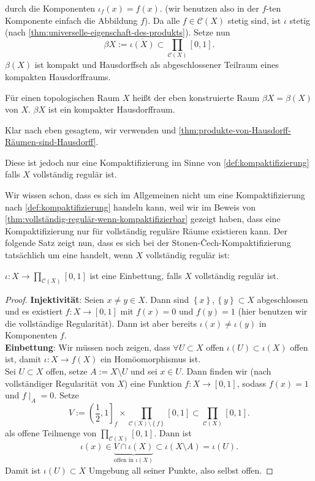 durch die Komponenten $ι_f(x) = f(x)$. (wir benutzen also in der  $f$-ten Komponente einfach die Abbildung  $f$). Da alle  $f\in \mathcal{C}(X)$ stetig sind, ist $ι$ stetig (nach \autoref{thm:universelle-eigenschaft-des-produkts}). Setze nun
\[
    βX := \overline{ι(X)} \subset \prod_{\mathcal{C}(X)} [0,1]
.\] 
$β(X)$ ist kompakt und Hausdorffsch als abgeschlossener Teilraum eines kompakten Hausdorffraums. \\
\begin{dtheoremdef}
    Für einen topologischen Raum $X$ heißt der eben konstruierte Raum $βX = β(X)$  von $X$. $\beta X$ ist ein kompakter Hausdorffraum.
\end{dtheoremdef}
\begin{proof*}
    Klar nach eben gesagtem, wir verwenden  und \autoref{thm:produkte-von-Hausdorff-Räumen-sind-Hausdorff}.
\end{proof*}
\begin{warning}
Diese ist jedoch nur eine Kompaktifizierung im Sinne von \autoref{def:kompaktifizierung} falls $X$ vollständig regulär ist.
\end{warning}
\begin{remark*}
    Wir wissen schon, dass es sich im Allgemeinen nicht um eine Kompaktifizierung nach \autoref{def:kompaktifizierung} handeln kann, weil wir im Beweis von \autoref{thm:vollständig-regulär-wenn-kompaktifizierbar} gezeigt haben, dass eine Kompaktifizierung nur für vollständig reguläre Räume existieren kann. Der folgende Satz zeigt nun, dass es sich bei der Stonen-Čech-Kompaktifizierung tatsächlich um eine handelt, wenn $X$ vollständig regulär ist:
\end{remark*}
\begin{theorem}\label{thm:stone-cech-kompaktifizierung-ist-einbettung-für-vollständig-reguläre-räume}
     $ι: X \to  \prod_{\mathcal{C}(X)}[0,1]$ ist eine Einbettung, falls $X$ vollständig regulär ist.
\end{theorem}
\begin{proof}
    \textbf{Injektivität}: Seien $x\neq y\in X$. Dann sind $\left \{x\right\} ,\left \{y\right\} \subset X$ abgeschlossen und es existiert $f: X \to  [0,1]$ mit $f(x) = 0$ und  $f(y) = 1$ (hier benutzen wir die vollständige Regularität). Dann ist aber bereits  $ι(x) \neq  ι(y)$ in Komponenten $f$. \\
    \textbf{Einbettung}: Wir müssen noch zeigen, dass $\forall  U\subset X$ offen $ι(U) \subset ι(X)$ offen ist, damit $ι : X \to  f(X)$ ein Homöomorphismus ist. \\
    Sei $U\subset X$ offen, setze $A := X\setminus U$ und sei $x\in U$. Dann finden wir (nach vollständiger Regularität von $X$) eine Funktion  $f: X \to  [0,1]$, sodass $f(x) = 1$ und  $f\mid _{A} = 0$. Setze
    \[
        V := \left( \frac{1}{2},1 \right]_f \times \prod_{\mathcal{C}(X) \setminus \left \{f\right\} } [0,1] \subset \prod_{\mathcal{C}(X)} [0,1]
    .\] 
    als offene Teilmenge von $\prod_{\mathcal{C}(X)} [0,1]$. Dann ist
    \[
        ι(x) \in \underbrace{V \cap  ι(X)}_{\text{offen in } ι(X)} \subset ι(X \setminus A) = ι(U)
    .\] 
    Damit ist $ι(U)\subset X$ Umgebung all seiner Punkte, also selbst offen.
\end{proof}
